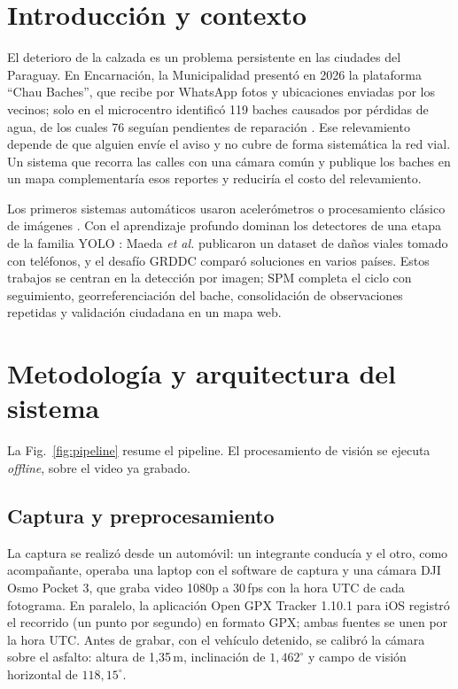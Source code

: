 \documentclass[conference]{IEEEtran}
\begin{document}
\section{Introducción y contexto}

El deterioro de la calzada es un problema persistente en las ciudades del
Paraguay. En Encarnación, la Municipalidad presentó en 2026 la plataforma
``Chau Baches'', que recibe por WhatsApp fotos y ubicaciones enviadas por los
vecinos; solo en el microcentro identificó 119 baches causados por pérdidas de
agua, de los cuales 76 seguían pendientes de reparación \cite{chaubaches2026}.
Ese relevamiento depende de que alguien envíe el aviso y no cubre de forma
sistemática la red vial. Un sistema que recorra las calles con una cámara común
y publique los baches en un mapa complementaría esos reportes y reduciría el
costo del relevamiento.

Los primeros sistemas automáticos usaron acelerómetros \cite{eriksson2008} o
procesamiento clásico de imágenes \cite{koch2011}. Con el aprendizaje profundo
dominan los detectores de una etapa de la familia YOLO \cite{redmon2016}: Maeda
\emph{et al.} \cite{maeda2018} publicaron un dataset de daños viales tomado con
teléfonos, y el desafío GRDDC \cite{arya2020} comparó soluciones en varios
países. Estos trabajos se centran en la detección por imagen; SPM completa el
ciclo con seguimiento, georreferenciación del bache, consolidación de
observaciones repetidas y validación ciudadana en un mapa web.

\section{Metodología y arquitectura del sistema}

La Fig.~\ref{fig:pipeline} resume el pipeline. El procesamiento de visión se
ejecuta \emph{offline}, sobre el video ya grabado.

\subsection{Captura y preprocesamiento}
La captura se realizó desde un automóvil: un integrante conducía y el otro, como
acompañante, operaba una laptop con el software de captura y una cámara DJI
Osmo Pocket 3, que graba video 1080p a 30\,fps con la hora UTC de cada
fotograma. En paralelo, la aplicación Open GPX Tracker 1.10.1 para iOS registró
el recorrido (un punto por segundo) en formato GPX; ambas fuentes se unen por la
hora UTC. Antes de grabar, con el vehículo detenido, se calibró la cámara sobre
el asfalto: altura de 1,35\,m, inclinación de $1{,}462^{\circ}$ y campo de visión
horizontal de $118{,}15^{\circ}$.
\end{document}

